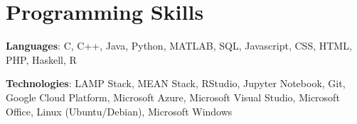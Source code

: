 \documentclass[letterpaper,11pt]{article}
\newcommand{\resumeSubHeadingListStart}{\begin{itemize}[leftmargin=*]}
\newcommand{\resumeSubHeadingListEnd}{\end{itemize}}
\begin{document}

\section{Programming Skills}
  \resumeSubHeadingListStart
    \item{
      \textbf{Languages}{: C, C++,  Java, Python, MATLAB, SQL, Javascript, CSS, HTML, PHP, Haskell, R}
     \item
      \textbf{Technologies}{: LAMP Stack, MEAN Stack, RStudio, Jupyter Notebook, Git, Google Cloud Platform, Microsoft Azure, Microsoft Visual Studio, Microsoft Office, Linux (Ubuntu/Debian), Microsoft Windows}
    }
  \resumeSubHeadingListEnd


\end{document}
